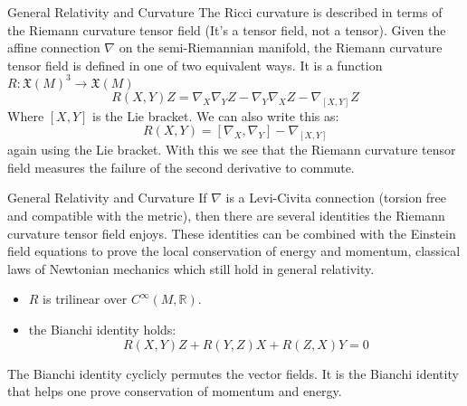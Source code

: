 \documentclass{beamer}
\begin{document}
    \begin{frame}{General Relativity and Curvature}
        The Ricci curvature is described in terms of the Riemann curvature
        tensor field (It's a tensor field, not a tensor). Given the affine
        connection $\nabla$ on the semi-Riemannian manifold, the Riemann
        curvature tensor field is defined in one of two equivalent ways.
        It is a function $R:\mathfrak{X}(M)^{3}\rightarrow\mathfrak{X}(M)$
        \begin{equation}
            R(X,Y)Z=
                \nabla_{X}\nabla_{Y}Z-\nabla_{Y}\nabla_{X}Z-\nabla_{[X,Y]}Z
        \end{equation}
        Where $[X,Y]$ is the Lie bracket. We can also write this as:
        \begin{equation}
            R(X,Y)=[\nabla_{X},\nabla_{Y}]-\nabla_{[X,Y]}
        \end{equation}
        again using the Lie bracket. With this we see that the Riemann
        curvature tensor field measures the failure of the second derivative to
        commute.
    \end{frame}
    \begin{frame}{General Relativity and Curvature}
        If $\nabla$ is a Levi-Civita connection (torsion free and compatible
        with the metric), then there are several identities the Riemann
        curvature tensor field enjoys. These identities can be combined with
        the Einstein field equations to prove the local conservation of
        energy and momentum, classical laws of Newtonian mechanics which still
        hold in general relativity.
        \begin{itemize}
            \item $R$ is trilinear over $C^{\infty}(M,\mathbb{R})$.
            \item the Bianchi identity holds:
                \begin{equation}
                    R(X,Y)Z+R(Y,Z)X+R(Z,X)Y=0
                \end{equation}
        \end{itemize}
        The Bianchi identity cyclicly permutes the vector fields. It is the
        Bianchi identity that helps one prove conservation of momentum and
        energy.
    \end{frame}
\end{document}
